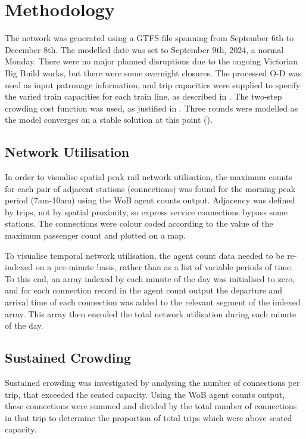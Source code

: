 \section{Methodology}
\label{sec:methodology}
The network was generated using a GTFS file spanning from September 6th to December 8th. The modelled date was set to September 9th, 2024, a normal Monday. There were no major planned disruptions due to the ongoing Victorian Big Build works, but there were some overnight closures. %
The processed O-D was used as input patronage information, and trip capacities were supplied to specify the varied train capacities for each train line, as described in . The two-step crowding cost function was used, as justified in . Three rounds were modelled as the model converges on a stable solution at this point (). 

\subsection{Network Utilisation}
In order to visualise spatial peak rail network utilisation, the maximum counts for each pair of adjacent stations (connections) was found for the morning peak period (7am-10am) using the WoB agent counts output. Adjacency was defined by trips, not by spatial proximity, so express service connections bypass some stations. The connections were colour coded according to the value of the maximum passenger count and plotted on a map. 

To visualise temporal network utilisation, the agent count data needed to be re-indexed on a per-minute basis, rather than as a list of variable periods of time. To this end, an array indexed by each minute of the day was initialised to zero, and for each connection record in the agent count output the departure and arrival time of each connection was added to the relevant segment of the indexed array. This array then encoded the total network utilisation during each minute of the day.

\subsection{Sustained Crowding}
Sustained crowding was investigated by analysing the number of connections per trip, that exceeded the seated capacity. Using the WoB agent counts output, these connections were summed and divided by the total number of connections in that trip to determine the proportion of total trips which were above seated capacity. 

